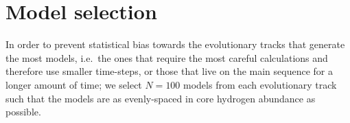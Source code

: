 \documentclass[manuscript]{aastex}
\begin{document}



\section{Model selection}
\label{sec:selection}
In order to prevent statistical bias towards the evolutionary tracks that generate the most models, i.e.~the ones that require the most careful calculations and therefore use smaller time-steps, or those that live on the main sequence for a longer amount of time; we select $N=100$ models from each evolutionary track such that the models are as evenly-spaced in core hydrogen abundance as possible. 
\end{document}
